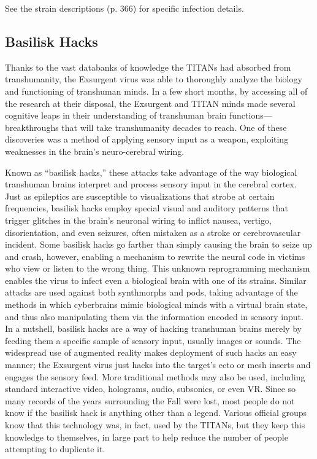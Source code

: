 See the strain descriptions (p. 366) for specific infection
details.

\subsection{Basilisk Hacks}

Thanks to the vast databanks of knowledge the TITANs 
had absorbed from transhumanity, the Exsurgent virus 
was able to thoroughly analyze the biology and functioning
of transhuman minds. In a few short months, by
accessing all of the research at their disposal, the Exsurgent
and TITAN minds made several cognitive leaps in
their understanding of transhuman brain functions—
breakthroughs that will take transhumanity decades to 
reach. One of these discoveries was a method of applying
sensory input as a weapon, exploiting weaknesses
in the brain's neuro-cerebral wiring.

Known as ``basilisk hacks,'' these attacks take 
advantage of the way biological transhuman brains 
interpret and process sensory input in the cerebral 
cortex. Just as epileptics are susceptible to visualizations
that strobe at certain frequencies, basilisk hacks
employ special visual and auditory patterns that trigger
glitches in the brain's neuronal wiring to inflict
nausea, vertigo, disorientation, and even seizures, 
often mistaken as a stroke or cerebrovascular incident. 
Some basilisk hacks go farther than simply causing 
the brain to seize up and crash, however, enabling a 
mechanism to rewrite the neural code in victims who 
view or listen to the wrong thing. This unknown reprogramming
mechanism enables the virus to infect
even a biological brain with one of its strains. Similar 
attacks are used against both synthmorphs and pods, 
taking advantage of the methods in which cyberbrains 
mimic biological minds with a virtual brain state, and 
thus also manipulating them via the information encoded
in sensory input.
In a nutshell, basilisk hacks are a way of hacking 
transhuman brains merely by feeding them a specific 
sample of sensory input, usually images or sounds. 
The widespread use of augmented reality makes 
deployment of such hacks an easy manner; the Exsurgent
virus just hacks into the target's ecto or mesh
inserts and engages the sensory feed. More traditional 
methods may also be used, including standard interactive
video, holograms, audio, subsonics, or even VR.
Since so many records of the years surrounding 
the Fall were lost, most people do not know if the 
basilisk hack is anything other than a legend. Various 
official groups know that this technology was, in fact, 
used by the TITANs, but they keep this knowledge to 
themselves, in large part to help reduce the number of 
people attempting to duplicate it. 

